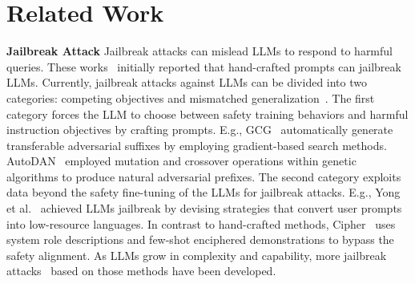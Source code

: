 \documentclass{article}
\begin{document}
\section{Related Work}

\textbf{Jailbreak Attack} Jailbreak attacks can mislead LLMs to respond to harmful queries. These works~\citep{website1, website2} initially reported that hand-crafted prompts can jailbreak LLMs. Currently, jailbreak attacks against LLMs can be divided into two categories: competing objectives and mismatched generalization~\citep{wei2024jailbroken}. The first category forces the LLM to choose between safety training behaviors and harmful instruction objectives by crafting prompts. E.g., GCG~\citep{zou2023universal} automatically generate transferable adversarial suffixes by employing gradient-based search methods. AutoDAN~\citep{liu2023autodan} employed mutation and crossover operations within genetic algorithms to produce natural adversarial prefixes. The second category exploits data beyond the safety fine-tuning of the LLMs for jailbreak attacks. E.g., Yong et al.~\citep{yong2023low} achieved LLMs jailbreak by devising strategies that convert user prompts into low-resource languages. In contrast to hand-crafted methods,  Cipher~\citep{yuan2023gpt} uses system role descriptions and few-shot enciphered demonstrations to bypass the safety alignment. As LLMs grow in complexity and capability, more jailbreak attacks~\citep{jia2024improved, liu2023jailbreaking,  wei2024jailbroken, ding2023wolf, chao2023jailbreaking, zhang2024boosting, paulus2024advprompter} based on those methods have been developed.
\end{document}
